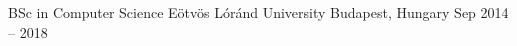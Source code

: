 \documentclass[]{awesome-cv}
\begin{document}
\begin{cventries}
	\cventry
	{BSc in Computer Science}
	{Eötvös Lóránd University}
	{Budapest, Hungary}
	{Sep 2014 – 2018}
	{}
\end{cventries}

\vspace{-2mm}
\ 
\end{document}

